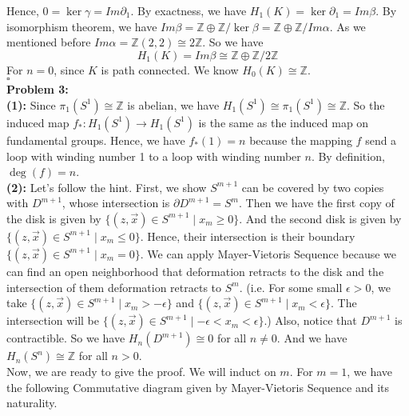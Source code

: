 \documentclass[12pt]{amsart}
\newcommand{\Z}{\mathbb{Z}}
\begin{document}
Hence, $0=\ker\gamma=Im\partial_1$. By exactness, we have $H_1(K)=\ker\partial_1=Im\beta$. By isomorphism theorem, we have $Im\beta=\Z\oplus\Z/\ker\beta=\Z\oplus\Z/Im\alpha$. As we mentioned before $Im\alpha=\Z(2,2)\cong 2\Z$. So we have 
\[H_1(K)=Im\beta\cong \Z\oplus\Z/2\Z\]
For $n=0$, since $K$ is path connected. We know $H_0(K)\cong\Z$.
\\\phantom{qed}\hfill$\square$\\
\textbf{Problem 3:}\\
\textbf{(1): }Since $\pi_1(S^1)\cong\Z$ is abelian, we have $H_1(S^1)\cong \pi_1(S^1)\cong \Z$. So the induced map $f_\ast:H_1(S^1)\to H_1(S^1)$ is the same as the induced map on fundamental groups. Hence, we have $f_\ast(1)=n$ because the mapping $f$ send a loop with winding number 1 to a loop with winding number $n$. By definition, $\deg(f)=n$.\\
\textbf{(2): }Let's follow the hint. First, we show $S^{m+1}$ can be covered by two copies with $D^{m+1}$, whose intersection is $\partial D^{m+1}=S^m$. Then we have the first copy of the disk is given by $\{(z,\vec{x})\in S^{m+1}\mid x_{m}\geq 0\}$. And the second disk is given by $\{(z,\vec{x})\in S^{m+1}\mid x_{m}\leq 0\}$. Hence, their intersection is their boundary $\{(z,\vec{x})\in S^{m+1}\mid x_{m}=0\}$. We can apply Mayer-Vietoris Sequence because we can find an open neighborhood that deformation retracts to the disk and the intersection of them deformation retracts to $S^{m}$. (i.e. For some small $\epsilon>0$, we take $\{(z,\vec{x})\in S^{m+1}\mid x_{m}>-\epsilon\}$ and $\{(z,\vec{x})\in S^{m+1}\mid x_{m}<\epsilon \}$. The intersection will be $\{(z,\vec{x})\in S^{m+1}\mid -\epsilon<x_{m}<\epsilon\}$.) Also, notice that $D^{m+1}$ is contractible. So we have $H_n(D^{m+1})\cong 0$ for all $n\neq 0$. And we have $H_n(S^n)\cong \Z$ for all $n>0$.\\
Now, we are ready to give the proof. We will induct on $m$. For $m=1$, we have the following Commutative diagram given by Mayer-Vietoris Sequence and its naturality. 
 
\end{document}
